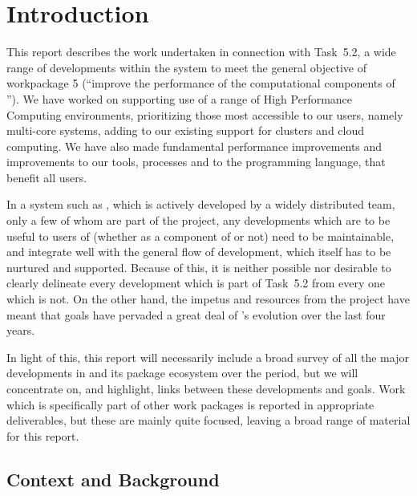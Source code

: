

\section{Introduction}
This report describes the work undertaken in connection with Task~5.2,
  a wide range of developments within the \GAP system to meet the
  general objective of workpackage 5 (``improve the performance of the
  computational components of \ODK''). We have worked on supporting
  use of a range of High Performance Computing environments,
  prioritizing those most accessible to our users, namely multi-core
  systems, adding to our existing support for clusters and cloud
  computing. We have also made fundamental performance improvements
  and improvements to our tools, processes and to the programming
  language, that benefit all \GAP users.

In a system such as \GAP, which is actively developed by a widely
distributed team, only a few of whom are part of the \ODK project, any
developments which are to be useful to users of \GAP (whether as a component of
\ODK or not) need to be maintainable, and
integrate well with the general flow of \GAP development, which itself
has to be nurtured and supported. Because of this, it is neither
possible nor desirable to clearly delineate every development which
is part of Task~5.2 from every one which is not. On the other hand,
the impetus and resources from the \ODK project have meant that \ODK
goals have pervaded a great deal of \GAP's evolution over the last
four years.

In light of this, this report will necessarily include  a broad
survey of all the major developments in \GAP and its package ecosystem
over the period, but we will concentrate on, and highlight, links between
these developments and \ODK goals. Work which is specifically part of
other work packages is reported in appropriate deliverables, but these
are mainly quite focused, leaving a broad range of material for this report.

\subsection{Context and Background}

